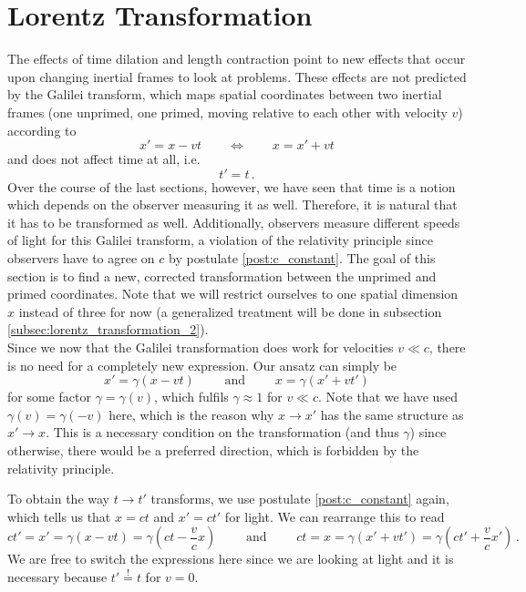 	\section{Lorentz Transformation}\label{sec:lorentz_transformation_1}
The effects of time dilation and length contraction point to new effects that occur upon changing inertial frames to look at problems. These effects are not predicted by the Galilei transform, which maps spatial coordinates between two inertial frames (one unprimed, one primed, moving relative to each other with velocity $v$) according to 
\begin{equation*}
	x' = x - v t
	\qquad \Leftrightarrow \qquad
	x = x' + v t
\end{equation*}
and does not affect time at all, i.e.
\begin{equation*}
	t' = t \, .
\end{equation*}
Over the course of the last sections, however, we have seen that time is a notion which depends on the observer measuring it as well. Therefore, it is natural that it has to be transformed as well. Additionally, observers measure different speeds of light for this Galilei transform, a violation of the relativity principle since observers have to agree on $c$ by postulate \ref{post:c_constant}. The goal of this section is to find a new, corrected transformation between the unprimed and primed coordinates. Note that we will restrict ourselves to one spatial dimension $x$ instead of three for now (a generalized treatment will be done in subsection \ref{subsec:lorentz_transformation_2}).\\


Since we now that the Galilei transformation does work for velocities $v \ll c$, there is no need for a completely new expression. Our ansatz can simply be
\begin{equation}\label{eq:lorentz_spatial_ansatz}
	x' = \gamma (x - vt)
	\qquad \text{ and } \qquad
	x = \gamma (x' + vt')
\end{equation}
for some factor $\gamma = \gamma(v)$, which fulfils $\gamma \approx 1$ for $v \ll c$. Note that we have used $\gamma(v) = \gamma(-v)$ here, which is the reason why $x \rightarrow x'$ has the same structure as $x' \rightarrow x$. This is a necessary condition on the transformation (and thus $\gamma$) since otherwise, there would be a preferred direction, which is forbidden by the relativity principle.

To obtain the way $t \rightarrow t'$ transforms, we use postulate \ref{post:c_constant} again, which tells us that $x = ct$ and $x' = ct'$ for light. We can rearrange this to read
\begin{equation}\label{eq:lorentz_time_ansatz}
	ct' = x' = \gamma (x - vt) = \gamma (ct - \frac{v}{c} x)
	\qquad \text{ and } \qquad
	ct = x = \gamma (x' + vt') = \gamma (ct' + \frac{v}{c} x') \, .
\end{equation}
We are free to switch the expressions here since we are looking at light and it is necessary because $t' \overset{!}{=} t$ for $v = 0$.

